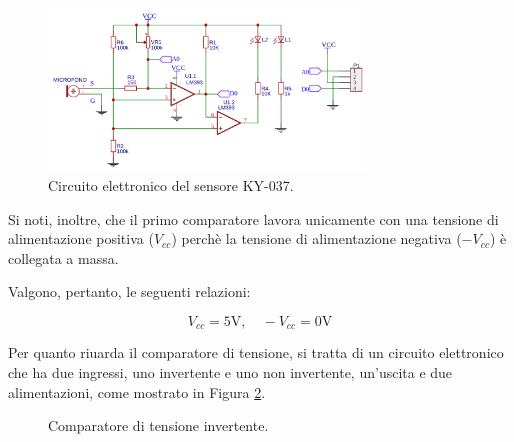 \documentclass[a4paper,12pt]{report}  %
\begin{document}
\begin{figure}[h]
    \centering
    \includegraphics[width=0.75\textwidth]{imgs/circuito-ky037.png}
    \caption{Circuito elettronico del sensore KY-037.}
    \label{fig:KY-037-circuit}
\end{figure}

Si noti, inoltre, che il primo comparatore lavora unicamente con una tensione di alimentazione positiva ($V_{cc}$) perchè la tensione di alimentazione negativa ($-V_{cc}$) è collegata a massa.

Valgono, pertanto, le seguenti relazioni:

\begin{equation}
    V_{cc} = 5 \text{V}, \quad -V_{cc} = 0 \text{V} \nonumber
\end{equation}

Per quanto riuarda il comparatore di tensione, si tratta di un circuito elettronico che ha due ingressi, uno invertente e uno non invertente, un'uscita e due alimentazioni, come mostrato in Figura \ref{fig:comparatore_invertente}.

\begin{figure}[h]
    \centering
    \caption{Comparatore di tensione invertente.}
    \label{fig:comparatore_invertente}
\end{figure}
\end{document}
